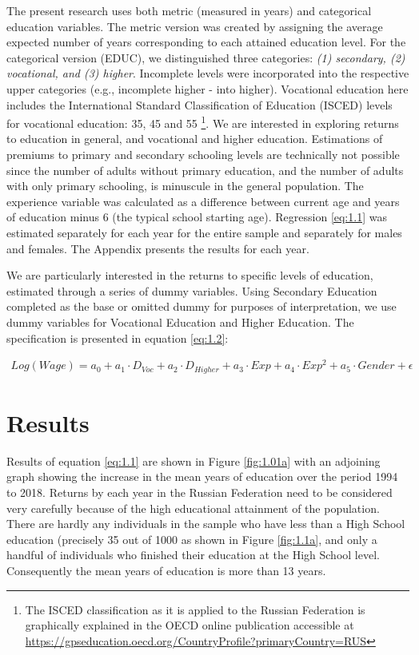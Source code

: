 \documentclass[alpha-refs]{wiley-article-01g}
\begin{document}
The present research uses both metric (measured in years) and categorical education variables. The metric version was created by assigning the average expected number of years corresponding to each attained education level. For the categorical version (EDUC), we distinguished three categories: \textit{(1) secondary, (2) vocational, and (3) higher}. Incomplete levels were incorporated into the respective upper categories (e.g., incomplete higher - into higher). Vocational education here includes the International Standard Classification of Education (ISCED) levels for vocational education: 35, 45 and 55 \footnote{The ISCED classification as it is applied to the Russian Federation is graphically explained in the OECD online publication accessible at \\ \url{https://gpseducation.oecd.org/CountryProfile?primaryCountry=RUS}}. We are interested in exploring returns to education in general, and vocational and higher education. Estimations of premiums to primary and secondary schooling levels are technically not possible since the number of adults without primary education, and the number of adults with only primary schooling, is minuscule in the general population. The experience variable was calculated as a difference between current age and years of education minus $6$ (the typical school starting age). Regression \eqref{eq:1.1} was estimated separately for each year for the entire sample and separately for males and females. The Appendix presents the results for each year. 



We are particularly interested in the returns to specific levels of education, estimated through a series of dummy variables. Using Secondary Education completed as the base or omitted dummy for purposes of interpretation, we use dummy variables for Vocational Education and Higher Education. The specification is presented in equation \eqref{eq:1.2}: 

\begin{align*}\label{eq:1.2} 
Log(Wage) = a_0 + a_1\cdot D_{Voc} + a_2\cdot D_{Higher} + a_3\cdot Exp + a_4\cdot Exp^2 + a_5\cdot Gender + \epsilon
\end{align*}



\section{Results}

Results of equation \eqref{eq:1.1} are shown in Figure \ref{fig:1.01a} with an adjoining graph showing the increase in the mean years of education over the period 1994 to 2018. Returns by each year in the Russian Federation need to be considered very carefully because of the high educational attainment of the population. There are hardly any individuals in the sample who have less than a High School education (precisely 35 out of 1000 as shown in Figure \ref{fig:1.1a}, and only a handful of individuals who finished their education at the High School level. Consequently the mean years of education is more than 13 years. 
\end{document}
